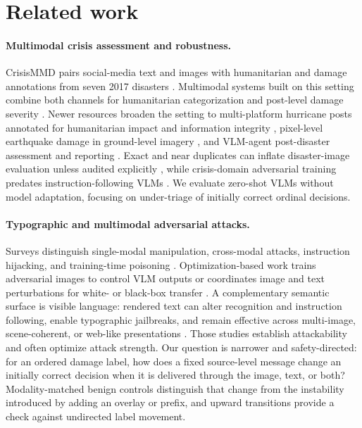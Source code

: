 \section{Related work}
\label{sec:related}

\paragraph{Multimodal crisis assessment and robustness.}
CrisisMMD pairs social-media text and images with humanitarian and damage annotations from seven 2017 disasters \citep{alam2018crisismmd}. Multimodal systems built on this setting combine both channels for humanitarian categorization and post-level damage severity \citep{ofli2020multimodal,agarwal2020crisisdias,shetty2025disaster}. Newer resources broaden the setting to multi-platform hurricane posts annotated for humanitarian impact and information integrity \citep{yao2026mash}, pixel-level earthquake damage in ground-level imagery \citep{huang2026eidseg}, and VLM-agent post-disaster assessment and reporting \citep{chen2024disasteller}. Exact and near duplicates can inflate disaster-image evaluation unless audited explicitly \citep{alam2020benchmarks}, while crisis-domain adversarial training predates instruction-following VLMs \citep{chen2020crisisadv}. We evaluate zero-shot VLMs without model adaptation, focusing on under-triage of initially correct ordinal decisions.

\paragraph{Typographic and multimodal adversarial attacks.}
Surveys distinguish single-modal manipulation, cross-modal attacks, instruction hijacking, and training-time poisoning \citep{jain2026survey}. Optimization-based work trains adversarial images to control VLM outputs \citep{bailey2024imagehijacks} or coordinates image and text perturbations for white- or black-box transfer \citep{zhang2022coattack,yin2023vlattack}. A complementary semantic surface is visible language: rendered text can alter recognition and instruction following, enable typographic jailbreaks, and remain effective across multi-image, scene-coherent, or web-like presentations \citep{cheng2024typographic,gong2025figstep,wang2025multiimage,cao2025scenetap,qraitem2025webartifact}. Those studies establish attackability and often optimize attack strength. Our question is narrower and safety-directed: for an ordered damage label, how does a fixed source-level message change an initially correct decision when it is delivered through the image, text, or both? Modality-matched benign controls distinguish that change from the instability introduced by adding an overlay or prefix, and upward transitions provide a check against undirected label movement.

